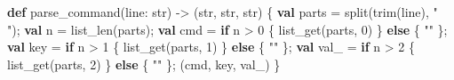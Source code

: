\documentclass[
  english,
]{book}
\newenvironment{Shaded}{\begin{snugshade}}{\end{snugshade}}
\newcommand{\ControlFlowTok}[1]{\textcolor[rgb]{0.77,0.53,0.75}{\textbf{#1}}}
\newcommand{\DataTypeTok}[1]{\textcolor[rgb]{0.31,0.79,0.69}{#1}}
\newcommand{\DecValTok}[1]{\textcolor[rgb]{0.71,0.81,0.66}{#1}}
\newcommand{\FunctionTok}[1]{\textcolor[rgb]{0.86,0.86,0.67}{#1}}
\newcommand{\KeywordTok}[1]{\textcolor[rgb]{0.34,0.61,0.84}{\textbf{#1}}}
\newcommand{\NormalTok}[1]{\textcolor[rgb]{0.83,0.83,0.83}{#1}}
\newcommand{\OperatorTok}[1]{\textcolor[rgb]{0.83,0.83,0.83}{#1}}
\newcommand{\StringTok}[1]{\textcolor[rgb]{0.81,0.57,0.47}{#1}}
\begin{document}
\begin{Shaded}
\begin{Highlighting}[]
\KeywordTok{def}\NormalTok{ parse\_command(line: }\DataTypeTok{str}\NormalTok{) }\OperatorTok{{-}\textgreater{}}\NormalTok{ (}\DataTypeTok{str}\NormalTok{, }\DataTypeTok{str}\NormalTok{, }\DataTypeTok{str}\NormalTok{) \{}
    \KeywordTok{val}\NormalTok{ parts }\OperatorTok{=} \FunctionTok{split}\NormalTok{(}\FunctionTok{trim}\NormalTok{(line), }\StringTok{" "}\NormalTok{);}
    \KeywordTok{val}\NormalTok{ n }\OperatorTok{=} \FunctionTok{list\_len}\NormalTok{(parts);}
    \KeywordTok{val}\NormalTok{ cmd }\OperatorTok{=} \ControlFlowTok{if}\NormalTok{ n }\OperatorTok{\textgreater{}} \DecValTok{0}\NormalTok{ \{ }\FunctionTok{list\_get}\NormalTok{(parts, }\DecValTok{0}\NormalTok{) \} }\ControlFlowTok{else}\NormalTok{ \{ }\StringTok{""}\NormalTok{ \};}
    \KeywordTok{val}\NormalTok{ key }\OperatorTok{=} \ControlFlowTok{if}\NormalTok{ n }\OperatorTok{\textgreater{}} \DecValTok{1}\NormalTok{ \{ }\FunctionTok{list\_get}\NormalTok{(parts, }\DecValTok{1}\NormalTok{) \} }\ControlFlowTok{else}\NormalTok{ \{ }\StringTok{""}\NormalTok{ \};}
    \KeywordTok{val}\NormalTok{ val\_ }\OperatorTok{=} \ControlFlowTok{if}\NormalTok{ n }\OperatorTok{\textgreater{}} \DecValTok{2}\NormalTok{ \{ }\FunctionTok{list\_get}\NormalTok{(parts, }\DecValTok{2}\NormalTok{) \} }\ControlFlowTok{else}\NormalTok{ \{ }\StringTok{""}\NormalTok{ \};}
\NormalTok{    (cmd, key, val\_)}
\NormalTok{\}}


\end{Highlighting}
\end{Shaded}
\end{document}

